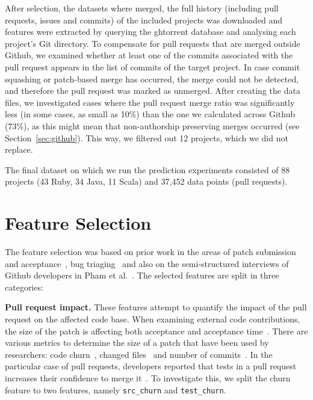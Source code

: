 \documentclass{acm_proc_article-sp}
\begin{document}
After selection, the datasets where merged, the full history (including pull
requests, issues and commits) of the included projects was downloaded and
features were extracted by querying the {\sc ght}orrent database and analysing
each project's Git directory.
To compensate for pull requests that are merged
outside Github, we examined whether at least one of the commits associated
with the pull request appears in the list of commits of the target project. In
case commit squashing or patch-based merge has occurred, the merge could not be
detected, and therefore the pull request was marked as unmerged.
After creating the data files, we investigated
cases where the pull request merge ratio was significantly less (in some cases,
as small as 10\%) than the one we calculated across Github (73\%), as this might
mean that non-authorship preserving merges occurred (see Section~\ref{sec:github}). This way, we filtered out 12 projects, which we did not replace. 

The final dataset on which we run the prediction experiments consisted of 88
projects (43 Ruby, 34 Java, 11 Scala) and 37,452 data points (pull requests).
%



\section{Feature Selection}
\label{sec:featureselection}

The feature selection was based on prior work in the areas of patch submission
and acceptance~\cite{Nagap05,Bird07a,Weiss08,Baysa12}, bug
triaging~\cite{Anvik06, Giger10} and also on the semi-structured interviews of
Github developers in Pham et al.~\cite{Pham13}. The selected features are split
in three categories:


  \textbf{Pull request impact.} These
    features attempt to quantify the impact of the
    pull request on the affected code base. When examining external code
    contributions, the size of the patch is affecting both acceptance and
    acceptance time~\cite{Weiss08}. There are various metrics to determine the
    size of a patch that have been used by researchers: code
    churn~\cite{Nagap05, Ratzi07}, changed files~\cite{Nagap05} and number of
    commits~\cite{Fluri07}. In the particular case of pull requests, developers
    reported that tests in a pull request increases their confidence to merge
    it~\cite{Pham13}. To investigate this, we split the churn feature to two
    features, namely \texttt{src\_churn} and \texttt{test\_churn}.
\end{document}
